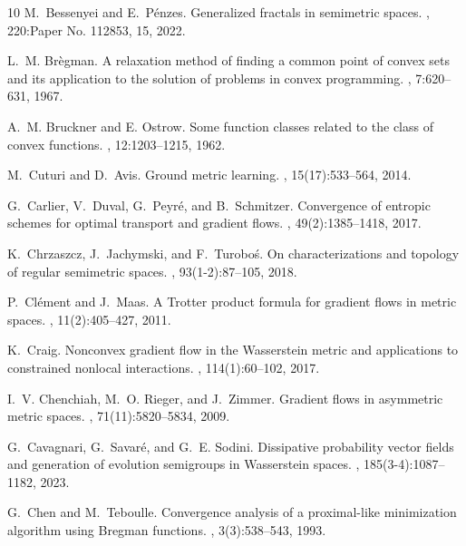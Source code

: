 \documentclass[reqno]{amsart}
\theoremstyle{plain}
\theoremstyle{remark}
\theoremstyle{plain}
\numberwithin{equation}{section}
\theoremstyle{remark}
\begin{document}
\begin{thebibliography}{10}
M.~Bessenyei and E.~P\'enzes.
\newblock Generalized fractals in semimetric spaces.
, 220:Paper No. 112853, 15, 2022.

L.~M. Br\`egman.
\newblock A relaxation method of finding a common point of convex sets and its
  application to the solution of problems in convex programming.
, 7:620--631, 1967.

A.~M. Bruckner and E. Ostrow.
\newblock Some function classes related to the class of convex functions.
, 12:1203--1215, 1962.


M.~Cuturi and D.~Avis.
\newblock Ground metric learning.
, 15(17):533--564, 2014.


G.~Carlier, V.~Duval, G.~Peyr\'e, and B.~Schmitzer.
\newblock Convergence of entropic schemes for optimal transport and gradient
  flows.
, 49(2):1385--1418, 2017.

K.~Chrzaszcz, J.~Jachymski, and F.~Turobo\'s.
\newblock On characterizations and topology of regular semimetric spaces.
, 93(1-2):87--105, 2018.

P.~Cl\'ement and J.~Maas.
\newblock A {T}rotter product formula for gradient flows in metric spaces.
, 11(2):405--427, 2011.

K.~Craig.
\newblock Nonconvex gradient flow in the {W}asserstein metric and applications
  to constrained nonlocal interactions.
, 114(1):60--102, 2017.

I.~V. Chenchiah, M.~O. Rieger, and J.~Zimmer.
\newblock Gradient flows in asymmetric metric spaces.
, 71(11):5820--5834, 2009.

G.~Cavagnari, G.~Savar\'e, and G.~E. Sodini.
\newblock Dissipative probability vector fields and generation of evolution
  semigroups in {W}asserstein spaces.
, 185(3-4):1087--1182, 2023.

G.~Chen and M.~Teboulle.
\newblock Convergence analysis of a proximal-like minimization algorithm using
  {B}regman functions.
, 3(3):538--543, 1993.


\end{thebibliography}
\end{document}
